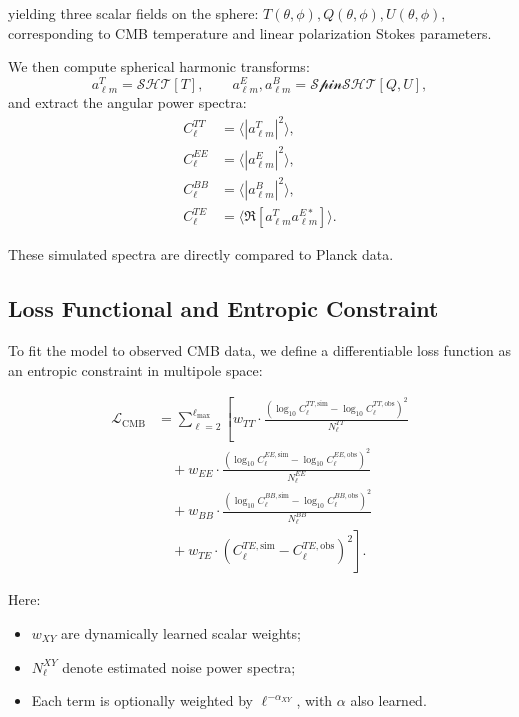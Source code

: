 \documentclass[12pt, a4paper]{article}
\begin{document}
yielding three scalar fields on the sphere: \( T(\theta, \phi), Q(\theta, \phi), U(\theta, \phi) \), corresponding to CMB temperature and linear polarization Stokes parameters.

We then compute spherical harmonic transforms:
\[
a_{\ell m}^T = \mathcal{SHT}[T], \qquad a_{\ell m}^E, a_{\ell m}^B = \mathcal{SpinSHT}[Q, U],
\]
and extract the angular power spectra:
\begin{align}
C_\ell^{TT} &= \langle |a_{\ell m}^T|^2 \rangle, \\
C_\ell^{EE} &= \langle |a_{\ell m}^E|^2 \rangle, \\
C_\ell^{BB} &= \langle |a_{\ell m}^B|^2 \rangle, \\
C_\ell^{TE} &= \langle \Re[a_{\ell m}^T a_{\ell m}^{E*}] \rangle.
\end{align}

These simulated spectra are directly compared to Planck data.

\subsection{Loss Functional and Entropic Constraint}

To fit the model to observed CMB data, we define a differentiable loss function as an entropic constraint in multipole space:

\begin{align}
\mathcal{L}_{\text{CMB}} &= \sum_{\ell = 2}^{\ell_{\max}} \left[
w_{TT} \cdot \frac{\left( \log_{10} C_\ell^{TT, \text{sim}} - \log_{10} C_\ell^{TT, \text{obs}} \right)^2}{N_\ell^{TT}} \right. \nonumber \\
&\quad + w_{EE} \cdot \frac{\left( \log_{10} C_\ell^{EE, \text{sim}} - \log_{10} C_\ell^{EE, \text{obs}} \right)^2}{N_\ell^{EE}} \nonumber \\
&\quad + w_{BB} \cdot \frac{\left( \log_{10} C_\ell^{BB, \text{sim}} - \log_{10} C_\ell^{BB, \text{obs}} \right)^2}{N_\ell^{BB}} \nonumber \\
&\quad + \left. w_{TE} \cdot \left( C_\ell^{TE, \text{sim}} - C_\ell^{TE, \text{obs}} \right)^2 \right].
\end{align}

Here:
\begin{itemize}
    \item \( w_{XY} \) are dynamically learned scalar weights;
    \item \( N_\ell^{XY} \) denote estimated noise power spectra;
    \item Each term is optionally weighted by \( \ell^{-\alpha_{XY}} \), with \( \alpha \) also learned.
\end{itemize}
\end{document}
